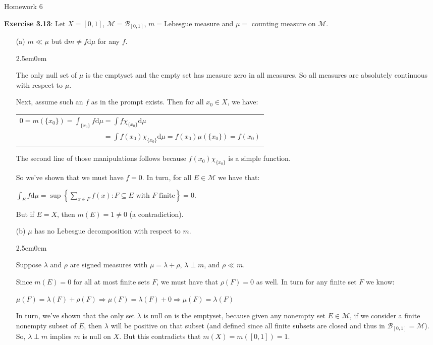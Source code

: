 \documentclass{book}
\newcommand{\exOne}{%
   \color{Purple}%
   \fontsize{13}{15}\selectfont%
}
\newcommand{\exTwoP}{%
   \color{RedViolet}%
   \fontsize{13}{15}\selectfont%
}
\newenvironment{myIndent}{%
   \begin{adjustwidth}{2.5em}{0em}%
}{%
   \end{adjustwidth}%
}
\newcommand{\blab}[1]{\textbf{#1}}
\newcommand{\myHS}{ \hspace{0.5em}}
\newcommand{\df}{\mathrm{d}}
\newcommand{\retTwo}{\hfill\bigbreak}
\newcommand{\mHeader}[1]{{
   \color{Black}%
   \fontsize{20}{18}\selectfont%
   #1\retTwo
}}
\begin{document}
\newpage
\exOne
\mHeader{Homework 6}

\blab{Exercise 3.13}: Let $X = [0, 1]$, $\mathcal{M} = \mathcal{B}_{[0, 1]}$, $m = \text{Lebesgue measure}$ and $\mu = \text{ counting measure}$ on $\mathcal{M}$.
\begin{enumerate}
	\item[(a)] $m \ll \mu$ but $\df m \neq f\df\mu$ for any $f$.
	
	\begin{myIndent}\exTwoP
		The only null set of $\mu$ is the emptyset and the empty set has measure zero in all measures. So all measures are absolutely continuous with respect to $\mu$.\retTwo

		Next, assume such an $f$ as in the prompt exists. Then for all $x_0 \in X$, we have:

		{\centering\begin{tabular}{l}
			 $0 = m(\{x_0\}) = \int_{\{x_0\}}f\df\mu = \int f\chi_{\{x_0\}}\df \mu$\\
			 $\phantom{0 = m(\{x_0\}) = \int_{\{x_0\}}f\df\mu} = \int f(x_0)\chi_{\{x_0\}}\df \mu = f(x_0)\mu(\{x_0\}) = f(x_0)$
		\end{tabular} \retTwo\par}

		The second line of those manipulations follows because $f(x_0)\chi_{\{x_0\}}$ is a simple function.\retTwo

		So we've shown that we must have $f = 0$. In turn, for all $E \in \mathcal{M}$ we have that:

		{\centering $\int_E f \df\mu = \sup\left\{\sum\limits_{x \in F}f(x) : F\subseteq E \text{ with } F \text{ finite}\right\} = 0$.\retTwo\par}

		But if $E = X$, then $m(E) = 1 \neq 0$ (a contradiction).\retTwo
	\end{myIndent}

	\item[(b)] $\mu$ has no Lebesgue decomposition with respect to $m$.
	
	\begin{myIndent}\exTwoP
		Suppose $\lambda$ and $\rho$ are signed measures with $\mu = \lambda + \rho$,\myHS $\lambda \perp m$, and $\rho \ll m$.\retTwo

		Since $m(E) = 0$ for all at most finite sets $F$, we must have that $\rho(F) = 0$ as well. In turn for any finite set $F$ we know:

		{\centering $\mu(F) = \lambda(F) + \rho(F) \Longrightarrow \mu(F) = \lambda(F) + 0 \Longrightarrow \mu(F) = \lambda(F)$ \retTwo\par}

		In turn, we've shown that the only set $\lambda$ is null on is the emptyset, because given any nonempty set $E \in \mathcal{M}$, if we consider a finite nonempty subset of $E$, then $\lambda$ will be positive on that subset (and defined since all finite subsets are closed and thus in $\mathcal{B}_{[0, 1]} = \mathcal{M}$). So, $\lambda \perp m$ implies $m$ is null on $X$. But this contradicts that $m(X) = m([0, 1]) = 1$.\retTwo
	\end{myIndent}
\end{enumerate}
\end{document}
